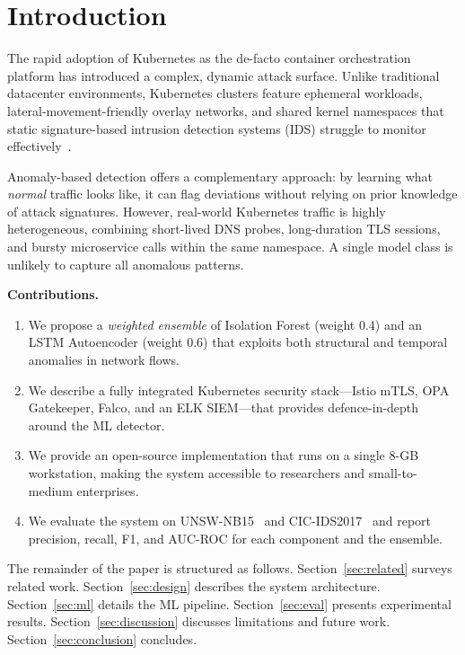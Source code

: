 \section{Introduction}
\label{sec:intro}

The rapid adoption of Kubernetes as the de-facto container orchestration
platform has introduced a complex, dynamic attack surface.
Unlike traditional datacenter environments, Kubernetes clusters feature
ephemeral workloads, lateral-movement-friendly overlay networks, and
shared kernel namespaces that static signature-based intrusion detection
systems (IDS) struggle to monitor effectively~\cite{sysdig2023threat}.

Anomaly-based detection offers a complementary approach: by learning what
\textit{normal} traffic looks like, it can flag deviations without relying
on prior knowledge of attack signatures.
However, real-world Kubernetes traffic is highly heterogeneous, combining
short-lived DNS probes, long-duration TLS sessions, and bursty microservice
calls within the same namespace.
A single model class is unlikely to capture all anomalous patterns.

\textbf{Contributions.}
\begin{enumerate}
  \item We propose a \emph{weighted ensemble} of Isolation Forest (weight 0.4)
        and an LSTM Autoencoder (weight 0.6) that exploits both structural
        and temporal anomalies in network flows.
  \item We describe a fully integrated Kubernetes security stack—Istio mTLS,
        OPA Gatekeeper, Falco, and an ELK SIEM—that provides defence-in-depth
        around the ML detector.
  \item We provide an open-source implementation that runs on a single
        8-GB workstation, making the system accessible to researchers and
        small-to-medium enterprises.
  \item We evaluate the system on UNSW-NB15~\cite{moustafa2015unsw} and
        CIC-IDS2017~\cite{sharafaldin2018toward} and report precision, recall,
        F1, and AUC-ROC for each component and the ensemble.
\end{enumerate}

The remainder of the paper is structured as follows.
Section~\ref{sec:related} surveys related work.
Section~\ref{sec:design} describes the system architecture.
Section~\ref{sec:ml} details the ML pipeline.
Section~\ref{sec:eval} presents experimental results.
Section~\ref{sec:discussion} discusses limitations and future work.
Section~\ref{sec:conclusion} concludes.
